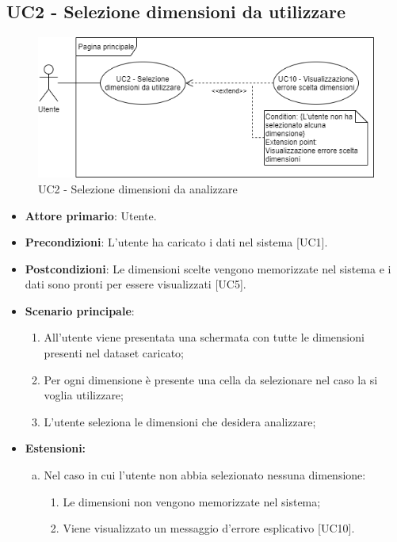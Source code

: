 \subsection{UC2 - Selezione dimensioni da utilizzare}
\begin{figure}[h]
\includegraphics[width=\linewidth]{Section/Images/UC2.png}
\centering
\caption{UC2 - Selezione dimensioni da analizzare}
\end{figure}
\begin{itemize}
	\item \textbf{Attore primario}: Utente.
	\item \textbf{Precondizioni}: L'utente ha caricato i dati nel sistema [UC1].
	\item \textbf{Postcondizioni}: Le dimensioni scelte vengono memorizzate nel sistema e i dati sono pronti per essere visualizzati [UC5].
	\item \textbf{Scenario principale}:
		\begin{enumerate}
			\item All'utente viene presentata una schermata con tutte le dimensioni presenti nel dataset caricato;
			\item Per ogni dimensione è presente una cella da selezionare nel caso la si voglia utilizzare;
			\item L'utente seleziona le dimensioni che desidera analizzare;
		\end{enumerate}
	\item \textbf{Estensioni:}
		\begin{enumerate}[(a)]
			\item Nel caso in cui l'utente non abbia selezionato nessuna dimensione:
			\begin{enumerate}[1.]
				\item Le dimensioni non vengono memorizzate nel sistema;
				\item Viene visualizzato un messaggio d'errore esplicativo [UC10].
			\end{enumerate}
		\end{enumerate}
\end{itemize}